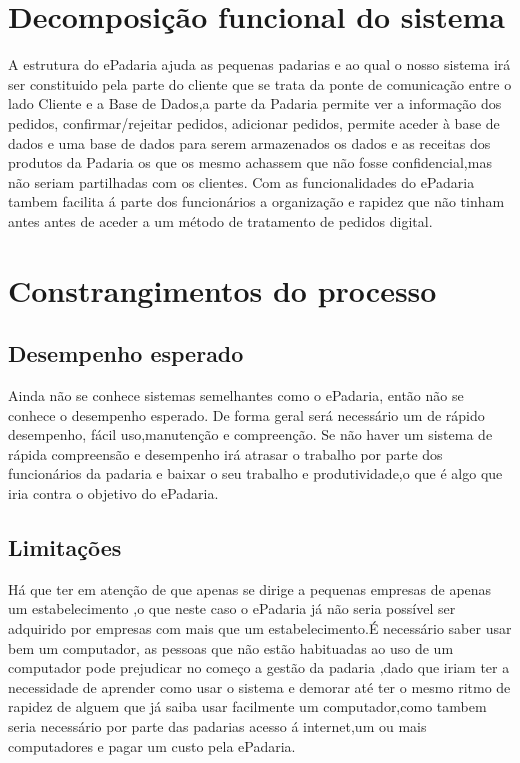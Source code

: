 \section{Decomposição funcional do sistema}


A estrutura do ePadaria ajuda as pequenas padarias e ao qual o nosso sistema irá ser constituido pela parte do cliente que se trata da ponte de comunicação entre o lado Cliente e a Base de Dados,a parte da Padaria permite ver a informação dos pedidos, confirmar/rejeitar pedidos, adicionar pedidos, permite aceder à base de dados e uma base de dados para serem armazenados os dados e as receitas dos produtos da Padaria os que os mesmo achassem que não fosse confidencial,mas não seriam partilhadas com os clientes. Com as funcionalidades do ePadaria tambem facilita á parte dos funcionários a organização e rapidez que não tinham antes antes de aceder a um método de tratamento de pedidos digital.

\section{Constrangimentos do processo}
\subsection{Desempenho esperado}
Ainda não se conhece sistemas semelhantes como o ePadaria, então não se conhece o desempenho esperado. De forma geral será necessário um de rápido desempenho, fácil uso,manutenção e compreenção. Se não haver um sistema de rápida compreensão e desempenho irá atrasar o trabalho por parte dos funcionários da padaria e baixar o seu trabalho e produtividade,o que é algo que iria contra o objetivo do ePadaria.

\subsection{Limitações} 
Há que ter em atenção de que apenas se dirige a pequenas empresas de apenas um estabelecimento ,o que neste caso o ePadaria já não seria possível ser adquirido por empresas com mais que um estabelecimento.É necessário saber usar bem um computador, as pessoas que não estão habituadas ao uso de um computador pode prejudicar no começo a gestão da padaria ,dado que iriam ter a necessidade de aprender como usar o sistema e demorar até ter o mesmo ritmo de rapidez de alguem que já saiba usar facilmente um computador,como tambem seria necessário por parte das padarias acesso á internet,um ou mais computadores e pagar um custo pela ePadaria.\\
